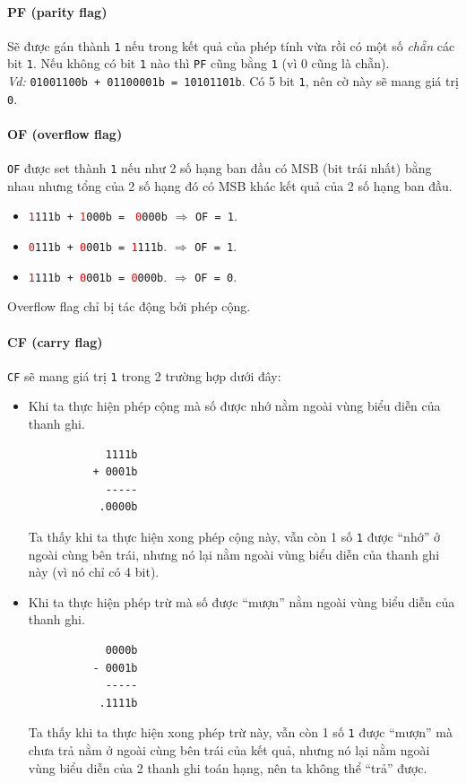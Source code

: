\documentclass[12pt]{report}
\newcommand{\code}[1]{\texttt{#1}}
\newcommand{\codeh}[1]{\textcolor{red}{\code{#1}}}
\begin{document}
\paragraph{PF (parity flag)}
Sẽ được gán thành \code 1 nếu trong kết quả của phép tính vừa rồi có một số \textit{chẵn} các bit \code 1. Nếu không có bit \code 1 nào thì \code{PF} cũng bằng \code 1 (vì 0 cũng là chẵn).\\
\textit{Vd:} \code{01001100b + 01100001b = 10101101b}. Có 5 bit \code 1, nên cờ này sẽ mang giá trị \code 0.

\paragraph{OF (overflow flag)}
\code{OF} được set thành \code 1 nếu như 2 số hạng ban đầu có MSB (bit trái nhất) bằng nhau nhưng tổng của 2 số hạng đó có MSB khác kết quả của 2 số hạng ban đầu.
\begin{itemize}
    \item \codeh{1}\code{111b + }\codeh{1}\code{000b = } \codeh{0}\code{000b} $\Rightarrow$ \code{OF = 1}.
    \item \codeh{0}\code{111b + }\codeh{0}\code{001b = }\codeh{1}\code{111b}. $\Rightarrow$ \code{OF = 1}.
    \item \codeh{1}\code{111b + }\codeh{0}\code{001b = }\codeh{0}\code{000b}. $\Rightarrow$ \code{OF = 0}.
\end{itemize}
Overflow flag chỉ bị tác động bởi phép cộng.

\paragraph{CF (carry flag)}
\code{CF} sẽ mang giá trị \code 1 trong 2 trường hợp dưới đây:
\begin{itemize}
    \item Khi ta thực hiện phép cộng mà số được nhớ nằm ngoài vùng biểu diễn của thanh ghi.
        \begin{verbatim}
            1111b 
          + 0001b 
            -----
           .0000b 
        \end{verbatim}
    Ta thấy khi ta thực hiện xong phép cộng này, vẫn còn 1 số \code 1 được ``nhớ'' ở ngoài cùng bên trái, nhưng nó lại nằm ngoài vùng biểu diễn của thanh ghi này (vì nó chỉ có 4 bit).
    \item Khi ta thực hiện phép trừ mà số được ``mượn'' nằm ngoài vùng biểu diễn của thanh ghi.
        \begin{verbatim}
            0000b 
          - 0001b 
            -----
           .1111b 
        \end{verbatim}
    Ta thấy khi ta thực hiện xong phép trừ này, vẫn còn 1 số \code 1 được ``mượn'' mà chưa trả nằm ở ngoài cùng bên trái của kết quả, nhưng nó lại nằm ngoài vùng biểu diễn của 2 thanh ghi toán hạng, nên ta không thể ``trả'' được.
\end{itemize}
\end{document}
